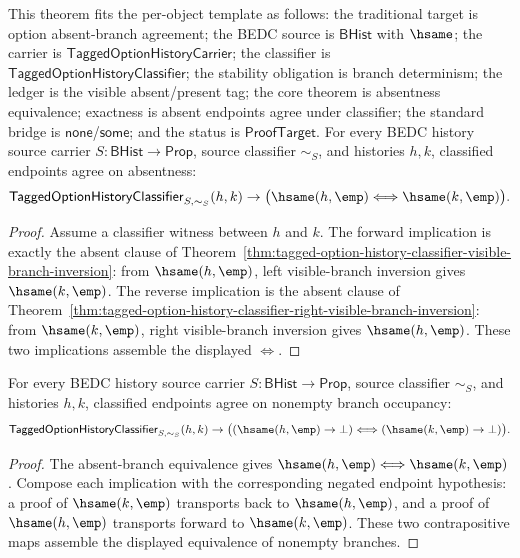 \begin{theorem}
\label{thm:tagged-option-history-classifier-absent-branch-equivalence}
This theorem fits the per-object template as follows: the traditional target is
option absent-branch agreement; the BEDC source is $\mathsf{BHist}$ with
$\hsame$; the carrier is $\mathsf{TaggedOptionHistoryCarrier}$; the classifier
is $\mathsf{TaggedOptionHistoryClassifier}$; the stability obligation is branch
determinism; the ledger is the visible absent/present tag; the core theorem is
absentness equivalence; exactness is absent endpoints agree under classifier;
the standard bridge is $\mathsf{none}$/$\mathsf{some}$; and the status is
$\mathsf{ProofTarget}$. For every BEDC history source carrier
$S:\mathsf{BHist}\to\mathsf{Prop}$, source classifier $\sim_S$, and histories
$h,k$, classified endpoints agree on absentness:
$$
\mathsf{TaggedOptionHistoryClassifier}_{S,\sim_S}(h,k)\to
\bigl(\hsame(h,\emp)\Longleftrightarrow\hsame(k,\emp)\bigr).
$$
\end{theorem}
\begin{proof}
Assume a classifier witness between $h$ and $k$. The forward implication is
exactly the absent clause of
Theorem~\ref{thm:tagged-option-history-classifier-visible-branch-inversion}:
from $\hsame(h,\emp)$, left visible-branch inversion gives
$\hsame(k,\emp)$. The reverse implication is the absent clause of
Theorem~\ref{thm:tagged-option-history-classifier-right-visible-branch-inversion}:
from $\hsame(k,\emp)$, right visible-branch inversion gives
$\hsame(h,\emp)$. These two implications assemble the displayed
$\Longleftrightarrow$.
\end{proof}

\begin{theorem}
\label{thm:tagged-option-history-classifier-nonempty-branch-equivalence}
For every BEDC history source carrier $S:\mathsf{BHist}\to\mathsf{Prop}$,
source classifier $\sim_S$, and histories $h,k$, classified endpoints agree on
nonempty branch occupancy:
$$
\mathsf{TaggedOptionHistoryClassifier}_{S,\sim_S}(h,k)\to
\bigl(
(\hsame(h,\emp)\to\bot)
\Longleftrightarrow
(\hsame(k,\emp)\to\bot)
\bigr).
$$
\end{theorem}
\begin{proof}
The absent-branch equivalence gives
$\hsame(h,\emp)\Longleftrightarrow\hsame(k,\emp)$. Compose each implication
with the corresponding negated endpoint hypothesis: a proof of
$\hsame(k,\emp)$ transports back to $\hsame(h,\emp)$, and a proof of
$\hsame(h,\emp)$ transports forward to $\hsame(k,\emp)$. These two
contrapositive maps assemble the displayed equivalence of nonempty branches.
\end{proof}

